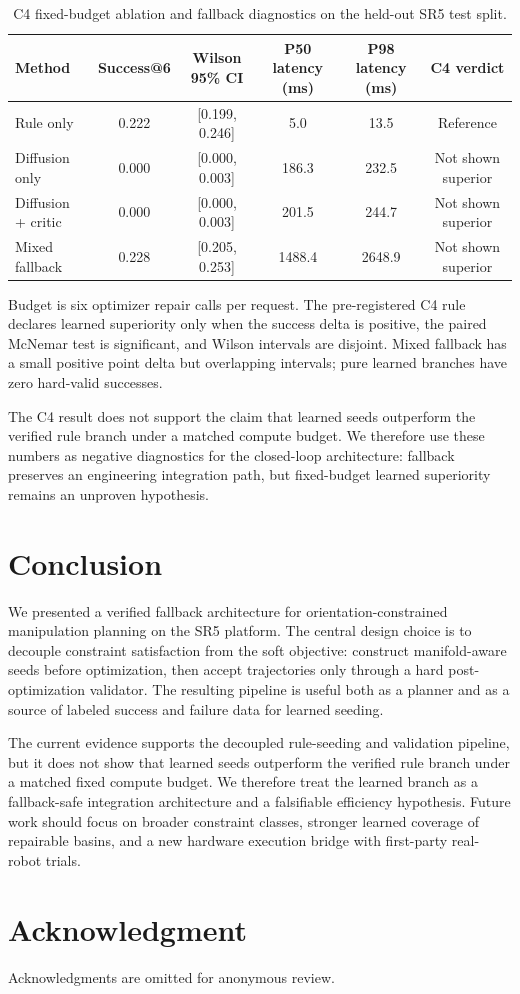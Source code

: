\documentclass[conference]{IEEEtran/IEEEtran}
\begin{document}
\begin{table}[t]
\caption{C4 fixed-budget ablation and fallback diagnostics on the held-out SR5 test split.}
\label{tab:main}
\centering
\scriptsize
\begin{tabular}{lccccc}
\toprule
Method & Success@6 & Wilson 95\% CI & P50 latency (ms) & P98 latency (ms) & C4 verdict \\
\midrule
Rule only & 0.222 & [0.199, 0.246] & 5.0 & 13.5 & Reference \\
Diffusion only & 0.000 & [0.000, 0.003] & 186.3 & 232.5 & Not shown superior \\
Diffusion + critic & 0.000 & [0.000, 0.003] & 201.5 & 244.7 & Not shown superior \\
Mixed fallback & 0.228 & [0.205, 0.253] & 1488.4 & 2648.9 & Not shown superior \\
\bottomrule
\end{tabular}
\vspace{0.3em}
\parbox{0.95\textwidth}{\footnotesize Budget is six optimizer repair calls per request.
The pre-registered C4 rule declares learned superiority only when the success
delta is positive, the paired McNemar test is significant, and Wilson intervals
are disjoint. Mixed fallback has a small positive point delta but overlapping
intervals; pure learned branches have zero hard-valid successes.}
\end{table}

The C4 result does not support the claim that learned seeds outperform the
verified rule branch under a matched compute budget. We therefore use these
numbers as negative diagnostics for the closed-loop architecture: fallback
preserves an engineering integration path, but fixed-budget learned superiority
remains an unproven hypothesis.

\section{Conclusion}
\label{sec:conclusion}
We presented a verified fallback architecture for orientation-constrained
manipulation planning on the SR5 platform. The central design choice is to
decouple constraint satisfaction from the soft objective: construct
manifold-aware seeds before optimization, then accept trajectories only through
a hard post-optimization validator. The resulting pipeline is useful both as a
planner and as a source of labeled success and failure data for learned seeding.

The current evidence supports the decoupled rule-seeding and validation
pipeline, but it does not show that learned seeds outperform the verified rule
branch under a matched fixed compute budget. We therefore treat the learned
branch as a fallback-safe integration architecture and a falsifiable efficiency
hypothesis. Future work should focus on broader constraint classes, stronger
learned coverage of repairable basins, and a new hardware execution bridge with
first-party real-robot trials.

\section*{Acknowledgment}
Acknowledgments are omitted for anonymous review.



\end{document}
